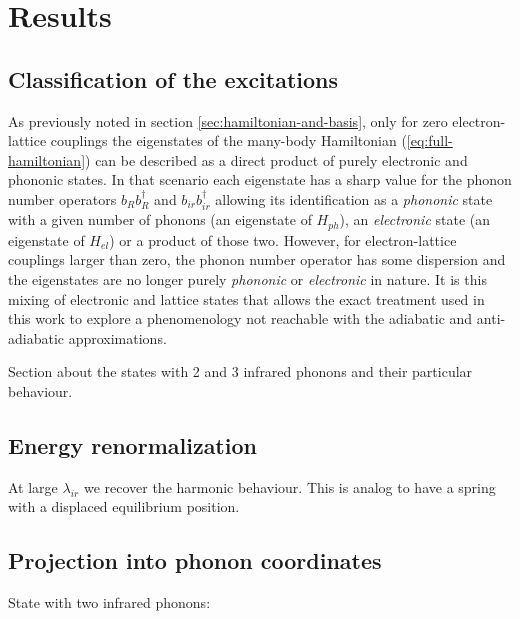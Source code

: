 \chapter{Results}
\label{chap:more_ir}

\section{Classification of the excitations}
\label{sec:classification}

As previously noted in section \ref{sec:hamiltonian-and-basis}, only for zero electron-lattice couplings the eigenstates of the many-body Hamiltonian (\ref{eq:full-hamiltonian}) can be described as a direct product of purely electronic and phononic states. 
In that scenario each eigenstate has a sharp value for the phonon number operators $b_Rb^\dagger_R$ and $b_{ir}b^\dagger_{ir}$ allowing its identification as a \textit{phononic} state with a given number of phonons (an eigenstate of $H_{ph}$), an \textit{electronic} state (an eigenstate of $H_{el}$) or a product of those two.
However, for electron-lattice couplings larger than zero, the phonon number operator has some dispersion and the eigenstates are no longer purely \textit{phononic} or \textit{electronic} in nature.
It is this mixing of electronic and lattice states that allows the exact treatment used in this work to explore a phenomenology not reachable with the adiabatic and anti-adiabatic approximations.



Section about the states with 2 and 3 infrared phonons and their particular behaviour.

\section{Energy renormalization}

At large $\lambda_{ir}$ we recover the harmonic behaviour. This is analog to have a spring with a displaced equilibrium position.

\section{Projection into phonon coordinates}

State with two infrared phonons:

